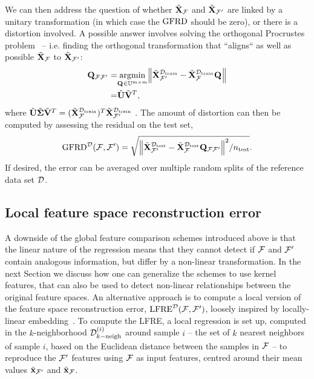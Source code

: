 We can then address the question of whether ${\tilde{\mathbf{X}}}_{\mathcal{F}}$ and ${\tilde{\mathbf{X}}}_{\mathcal{F}^{\prime}}$ are linked by a unitary transformation (in which case the $\operatorname{GFRD}$ should be zero), or there is a distortion involved.
A possible answer involves solving the orthogonal Procrustes problem~\cite{scho66pm} -- i.e. finding the orthogonal transformation that ``aligns``  as well as possible ${\tilde{\mathbf{X}}}_{\mathcal{F}}$ to ${\tilde{\mathbf{X}}}_{\mathcal{F}^{\prime}}$:
\begin{equation}
\begin{split}
  \mathbf{Q}_{{\mathcal{F}}{\mathcal{F}^{\prime}}} =& \underset{\mathbf{Q}_{{}{}} \in \mathbb{U}^{m\times m}}{\operatorname{argmin}}
\norm{{\tilde{\mathbf{X}}}^{\mathcal{D}_{\mathrm{train}}}_{\mathcal{F}^{\prime}} - {\tilde{\mathbf{X}}}^{\mathcal{D}_{\mathrm{train}}}_{\mathcal{F}} \mathbf{Q}_{{}{}}  }\\
=&\tilde{\mathbf{U}}\tilde{\mathbf{V}}^T,
\end{split}\label{eq:proc-ff1}
\end{equation}
where $\tilde{\mathbf{U}}\tilde{\boldsymbol{\Sigma}}\tilde{\mathbf{V}}^T = ({\tilde{\mathbf{X}}}_{\mathcal{F}}^{\mathcal{D}_{\mathrm{train}}})^T {\tilde{\mathbf{X}}}^{\mathcal{D}_{\mathrm{train}}}_{\mathcal{F}^{\prime}}$ .
The amount of distortion can then be computed by assessing the residual on the test set,
\begin{equation}
\operatorname{GFRD}^{\mathcal{D}}(\mathcal{F},\mathcal{F}^{\prime}) = \sqrt{{\norm{{{\tilde{\mathbf{X}}}}^{\mathcal{D}_{\mathrm{test}}}_{\mathcal{F}^{\prime}} - {{\tilde{\mathbf{X}}}}^{\mathcal{D}_{\mathrm{test}}}_{\mathcal{F}} \mathbf{Q}_{{\mathcal{F}}{\mathcal{F}^{\prime}}}  }^2}/n_{\mathrm{test}}}. \label{eq:GFRD}
\end{equation}
If desired, the error can be averaged over multiple random splits of the reference data set $\mathcal{D}$.

\subsection{Local feature space reconstruction error}

A downside of the global feature comparison schemes introduced above is that the linear nature of the regression means that they cannot detect if $\mathcal{F}$ and $\mathcal{F}^{\prime}$ contain analogous information, but differ by a non-linear transformation.
In the next Section we discuss how one can generalize the schemes to use kernel features, that can also be used to detect non-linear relationships between the original feature spaces.
An alternative approach is to compute a local version of the feature space reconstruction error, $\operatorname{LFRE}^{\mathcal{D}}(\mathcal{F},\mathcal{F}^{\prime})$, loosely inspired by locally-linear embedding~\cite{rowe-saul00science}. 
To compute the LFRE, a local regression is set up, computed in the $k$-neighborhood $\mathcal{D}_{k-\text{neigh}}^{(i)}$ around sample $i$  -- the set of $k$ nearest neighbors of sample $i$, based on the Euclidean distance between the samples in $\mathcal{F}$ -- to reproduce the $\mathcal{F}^{\prime}$ features using $\mathcal{F}$ as input features, centred around their mean values $\bar{\mathbf{x}}_{\mathcal{F}^{\prime}}$ and $\bar{\mathbf{x}}_{\mathcal{F}}$.


